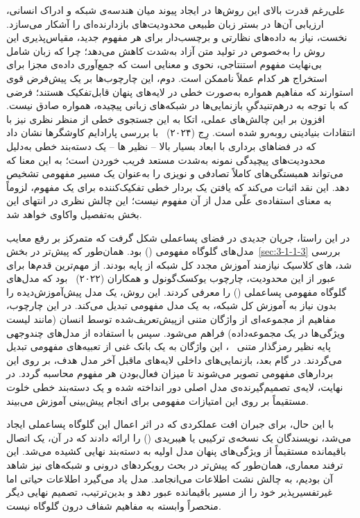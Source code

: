 علی‌رغم قدرت بالای این روش‌ها در ایجاد پیوند میان هندسه‌ی شبکه و ادراک انسانی، ارزیابی آن‌ها در بستر زبان طبیعی محدودیت‌های بازدارنده‌ای را آشکار می‌سازد. نخست، نیاز به داده‌های نظارتی و برچسب‌دار برای هر مفهوم جدید، مقیاس‌پذیری این روش را به‌خصوص در تولید متن آزاد به‌شدت کاهش می‌دهد؛ چرا که زبان شامل بی‌نهایت مفهوم استنتاجی، نحوی و معنایی است که جمع‌آوری داده‌ی مجزا برای استخراج هر کدام عملاً ناممکن است. دوم، این چارچوب‌ها بر یک پیش‌فرض قوی استوارند که مفاهیم همواره به‌صورت خطی در لایه‌های پنهان قابل‌تفکیک هستند؛ فرضی که با توجه به درهم‌تنیدگیِ بازنمایی‌ها در شبکه‌های زبانی پیچیده، همواره صادق نیست. افزون بر این چالش‌های عملی، اتکا به این جستجوی خطی از منظر نظری نیز با انتقادات بنیادینی روبه‌رو شده است. رِج (۲۰۲۴)~\cite{rege2024probe} با بررسی پارادایم کاوشگرها نشان داد که در فضاهای برداری با ابعاد بسیار بالا – نظیر ها – یک دسته‌بند خطی به‌دلیل محدودیت‌های پیچیدگی نمونه به‌شدت مستعد فریب خوردن است؛ به این معنا که می‌تواند همبستگی‌های کاملاً تصادفی و نویزی را به‌عنوان یک مسیر مفهومی تشخیص دهد. این نقد اثبات می‌کند که یافتن یک بردار خطی تفکیک‌کننده برای یک مفهوم، لزوماً به معنای استفاده‌ی علّی مدل از آن مفهوم نیست؛ این چالش نظری در انتهای این بخش به‌تفصیل واکاوی خواهد شد.

در این راستا، جریان جدیدی در فضای پساعملی شکل گرفت که متمرکز بر رفع معایب مدل‌های گلوگاه مفهومی () بود. همان‌طور که پیش‌تر در بخش~\ref{sec:3-1-1-3} بررسی شد، های کلاسیک نیازمند آموزش مجدد کل شبکه از پایه بودند. از مهم‌ترین قدم‌ها برای عبور از این محدودیت، چارچوب یوکسک‌گونول و همکاران (۲۰۲۲)~\cite{yuksekgonul2022posthoc} بود که مدل‌های گلوگاه مفهومی پساعملی () را معرفی کردند. این روش، یک مدل پیش‌آموزش‌دیده را بدون نیاز به آموزش کل شبکه، به یک مدل مفهومی تبدیل می‌کند. در این چارچوب، مفاهیم از مجموعه‌ای از واژگان متنی ازپیش‌تعریف‌شده توسط انسان (مانند لیست ویژگی‌ها در یک مجموعه‌داده) فراهم می‌شود. سپس با استفاده از مدل‌های چندوجهی پایه نظیر رمزگذار متنی ~\cite{radford2021learning}، این واژگان به یک بانک غنی از تعبیه‌های مفهومی تبدیل می‌گردند. در گام بعد، بازنمایی‌های داخلی لایه‌های ماقبل آخر مدل هدف، بر روی این بردارهای مفهومی تصویر می‌شوند تا میزان فعال‌بودن هر مفهوم محاسبه گردد. در نهایت، لایه‌ی تصمیم‌گیرنده‌ی مدل اصلی دور انداخته شده و یک دسته‌بند خطی خلوت مستقیماً بر روی این امتیازات مفهومی برای انجام پیش‌بینی آموزش می‌بیند.

با این حال، برای جبران افت عملکردی که در اثر اعمال این گلوگاه پساعملی ایجاد می‌شد، نویسندگان یک نسخه‌ی ترکیبی یا هیبریدی () را ارائه دادند که در آن، یک اتصال باقیمانده مستقیماً از ویژگی‌های پنهان مدل اولیه به دسته‌بند نهایی کشیده می‌شد. این ترفند معماری، همان‌طور که پیش‌تر در بحث رویکردهای درونی و شبکه‌های  نیز شاهد آن بودیم، به چالش نشت اطلاعات می‌انجامد. مدل یاد می‌گیرد اطلاعات حیاتی اما غیرتفسیرپذیر خود را از مسیر باقیمانده عبور دهد و بدین‌ترتیب، تصمیم نهایی دیگر منحصراً وابسته به مفاهیم شفاف درون گلوگاه نیست.

